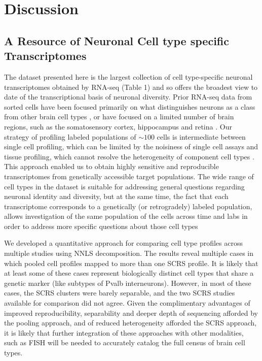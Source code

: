 
\section{Discussion}

\subsection{A Resource of Neuronal Cell type specific Transcriptomes}
The dataset presented here is the largest collection of cell type-specific neuronal transcriptomes obtained by RNA-seq (Table 1) and so offers the broadest view to date of the transcriptional basis of neuronal diversity. Prior RNA-seq data from sorted cells have been focused primarily on what distinguishes neurons as a class from other brain cell types \citep{Zhang_2014}, or have focused on a limited number of brain regions, such as the somatosensory cortex, hippocampus  \citep{Zeisel_2015,Cembrowski_2015,Tasic_2016} and retina \citep{Macosko_2015}. Our strategy of profiling labeled populations of $\sim100$ cells is intermediate between single cell profiling, which can be limited by the noisiness of single cell assays \citep{Marinov_2013} and tissue profiling, which cannot resolve the heterogeneity of component cell types \citep{Nelson_2006}. This approach enabled us to obtain highly sensitive and reproducible transcriptomes from genetically accessible target populations. The wide range of cell types in the dataset is suitable for addressing general questions regarding neuronal identity and diversity, but at the same time, the fact that each transcriptome corresponds to a genetically (or retrogradely) labeled population, allows investigation of the same population of the cells across time and labs in order to address more specific questions about those cell types

We developed a quantitative approach for comparing cell type profiles across multiple studies using NNLS decomposition. The results reveal multiple cases in which pooled cell profiles mapped to more than one SCRS profile. It is likely that at least some of these cases represent biologically distinct cell types that share a genetic marker (like subtypes of Pvalb interneurons). However, in most of these cases, the SCRS clusters were barely separable, and the two SCRS studies available for comparison did not agree. Given the complimentary advantages of improved reproducibility, separability and deeper depth of sequencing afforded by the pooling approach, and of reduced heterogeneity afforded the SCRS approach, it is likely that further integration of these approaches with other modalities, such as FISH \citep{Moffitt_2016} will be needed to accurately catalog the full census of brain cell types. 


